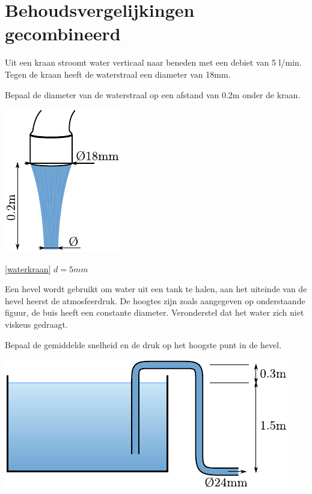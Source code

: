 \chapter{Behoudsvergelijkingen gecombineerd}
\label{sec:Behoudsvergelijkingen gecombineerd}
\begin{toepassing}[*]
	\label{waterkraan}
Uit een kraan stroomt water verticaal naar beneden met een debiet van 5 l/min. Tegen de kraan heeft de waterstraal een diameter van 18mm. 

Bepaal de diameter van de waterstraal op een afstand van 0.2m onder de kraan.

	\centering
	\includegraphics{fig/behoudsvergelijkingen/waterkraan}

\end{toepassing}
\begin{antwoord}{\ref{waterkraan}}
	$d = 5\unit{mm}$
\end{antwoord}
\begin{toepassing}[*]
	\label{hevel}
Een hevel wordt gebruikt om water uit een tank te halen, aan het uiteinde van de hevel heerst de atmosfeerdruk. De hoogtes zijn zoals aangegeven op onderstaande figuur, de buis heeft een constante diameter. Veronderstel dat het water zich niet viskeus gedraagt.
		
Bepaal de gemiddelde snelheid en de druk op het hoogste punt in de hevel.

	\centering
	\includegraphics{fig/behoudsvergelijkingen/hevel}

\end{toepassing}
